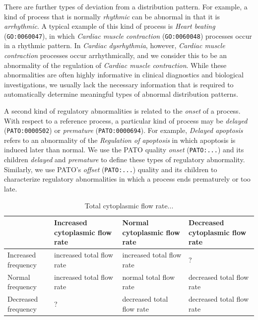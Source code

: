 \documentclass{bioinfo}
\begin{document}
There are further types of deviation from a distribution pattern. For
example, a kind of process that is normally {\em rhythmic} can be
abnormal in that it is {\em arrhythmic}. A typical example of this
kind of process is {\em Heart beating} ({\tt GO:0060047}), in which
{\em Cardiac muscle contraction} ({\tt GO:0060048}) processes occur in
a rhythmic pattern. In {\em Cardiac dysrhythmia}, however, {\em
  Cardiac muscle contraction} processes occur arrhythmically, and we
consider this to be an abnormality of the regulation of {\em Cardiac
  muscle contraction}. While these abnormalities are often highly
informative in clinical diagnostics and biological investigations, we
usually lack the necessary information that is required to
automatically determine meaningful types of abnormal distribution
patterns.

A second kind of regulatory abnormalities is related to the {\em
  onset} of a process. With respect to a reference process, a
particular kind of process may be {\em delayed} ({\tt PATO:0000502})
or {\em premature} ({\tt PATO:0000694}). For example, {\em Delayed
  apoptosis} refers to an abnormality of the {\em Regulation of
  apoptosis} in which apoptosis is induced later than normal.  We use
the PATO quality {\em onset} ({\tt PATO:...}) and its children {\em
  delayed} and {\em premature} to define these types of regulatory
abnormality. Similarly, we use PATO's {\em offset} ({\tt PATO:...})
  quality and its children to characterize regulatory abnormalities in
  which a process ends prematurely or too late.

\begin{table}
  \centering
  \begin{tabular}{l|l|l|l}
    & Increased cytoplasmic flow rate & Normal cytoplasmic flow rate & Decreased
    cytoplasmic flow rate \\
    \hline
    Increased frequency &increased total flow rate &increased total
    flow rate &?\\
    Normal frequency &increased total flow rate &normal total flow
    rate &decreased total flow rate\\
    Decreased frequency &?&decreased total flow rate &decreased total
    flow rate\\
    \hline
  \end{tabular}
  \caption{\label{tbl:flow}Total cytoplasmic flow rate...}
\end{table}
\end{document}
